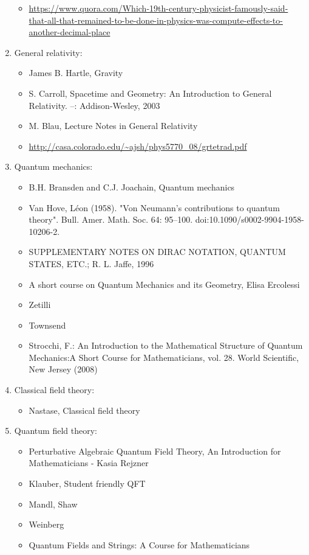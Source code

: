 \documentclass{report}
\begin{document}
\begin{enumerate}
\begin{itemize}
\item \url{https://www.quora.com/Which-19th-century-physicist-famously-said-that-all-that-remained-to-be-done-in-physics-was-compute-effects-to-another-decimal-place}
\end{itemize}
\item General relativity:
\begin{itemize}
\item James B. Hartle, Gravity
\item S. Carroll, Spacetime and Geometry: An Introduction to General Relativity. --: Addison-Wesley, 2003
\item M. Blau, Lecture Notes in General Relativity
\item \url{http://casa.colorado.edu/~ajsh/phys5770_08/grtetrad.pdf}
\end{itemize}
\item Quantum mechanics:
\begin{itemize}
\item B.H. Bransden and C.J. Joachain, Quantum mechanics
\item Van Hove, Léon (1958). "Von Neumann's contributions to quantum theory". Bull. Amer. Math. Soc. 64: 95–100. doi:10.1090/s0002-9904-1958-10206-2.
\item SUPPLEMENTARY NOTES ON DIRAC NOTATION,
QUANTUM STATES, ETC.; R. L. Jaffe, 1996
\item A short course on Quantum Mechanics and its Geometry, Elisa Ercolessi
\item Zetilli
\item Townsend
\item Strocchi, F.: An Introduction to the Mathematical Structure of Quantum Mechanics:A Short Course for Mathematicians, vol. 28. World Scientific, New Jersey (2008)
\end{itemize}
\item Classical field theory:
\begin{itemize}
\item Nastase, Classical field theory
\end{itemize}
\item Quantum field theory:
\begin{itemize}
\item Perturbative Algebraic Quantum Field Theory, An Introduction for Mathematicians - Kasia Rejzner
\item Klauber, Student friendly QFT
\item Mandl, Shaw
\item Weinberg 
\item Quantum Fields and Strings:  A Course for Mathematicians

\end{itemize}
\end{enumerate}
\end{document}
